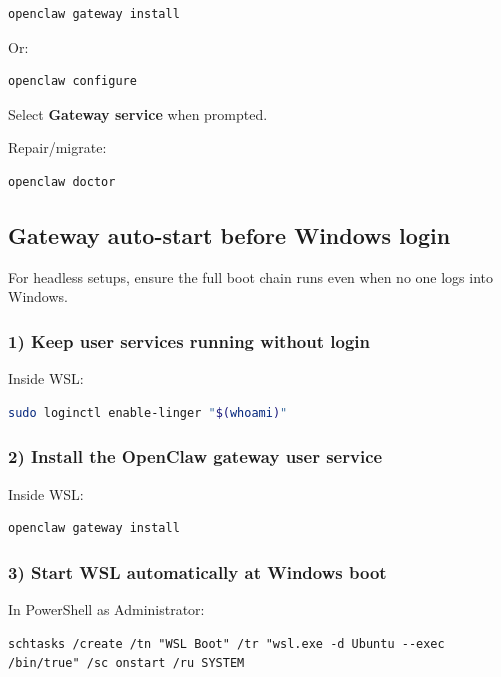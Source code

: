 \begin{lstlisting}
openclaw gateway install
\end{lstlisting}


Or:

\begin{lstlisting}
openclaw configure
\end{lstlisting}


Select \textbf{Gateway service} when prompted.

Repair/migrate:

\begin{lstlisting}
openclaw doctor
\end{lstlisting}


\subsection{Gateway auto-start before Windows login}


For headless setups, ensure the full boot chain runs even when no one logs into
Windows.

\subsubsection{1) Keep user services running without login}


Inside WSL:

\begin{lstlisting}[language=bash]
sudo loginctl enable-linger "$(whoami)"
\end{lstlisting}


\subsubsection{2) Install the OpenClaw gateway user service}


Inside WSL:

\begin{lstlisting}[language=bash]
openclaw gateway install
\end{lstlisting}


\subsubsection{3) Start WSL automatically at Windows boot}


In PowerShell as Administrator:

\begin{lstlisting}
schtasks /create /tn "WSL Boot" /tr "wsl.exe -d Ubuntu --exec /bin/true" /sc onstart /ru SYSTEM
\end{lstlisting}


